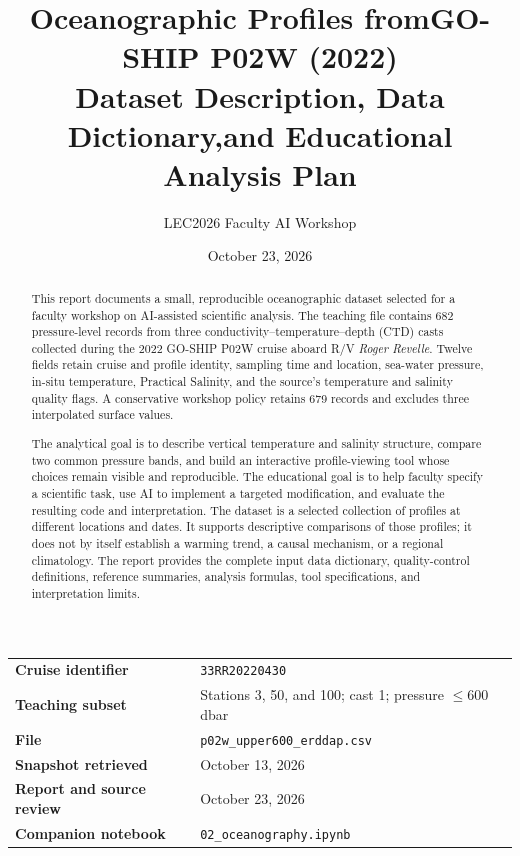 \documentclass[11pt,letterpaper]{article}
\title{\textbf{Oceanographic Profiles from\newline GO-SHIP P02W (2022)}\\[6pt]
  \large Dataset Description, Data Dictionary,\newline and Educational Analysis Plan}
\author{LEC2026 Faculty AI Workshop}
\date{October 23, 2026}
\newcommand{\field}[1]{\nolinkurl{#1}}
\begin{document}
\maketitle
\thispagestyle{empty}

\begin{abstract}
This report documents a small, reproducible oceanographic dataset selected for a faculty workshop on AI-assisted scientific analysis. The teaching file contains 682 pressure-level records from three conductivity--temperature--depth (CTD) casts collected during the 2022 GO-SHIP P02W cruise aboard R/V \emph{Roger Revelle}. Twelve fields retain cruise and profile identity, sampling time and location, sea-water pressure, in-situ temperature, Practical Salinity, and the source's temperature and salinity quality flags. A conservative workshop policy retains 679 records and excludes three interpolated surface values.

The analytical goal is to describe vertical temperature and salinity structure, compare two common pressure bands, and build an interactive profile-viewing tool whose choices remain visible and reproducible. The educational goal is to help faculty specify a scientific task, use AI to implement a targeted modification, and evaluate the resulting code and interpretation. The dataset is a selected collection of profiles at different locations and dates. It supports descriptive comparisons of those profiles; it does not by itself establish a warming trend, a causal mechanism, or a regional climatology. The report provides the complete input data dictionary, quality-control definitions, reference summaries, analysis formulas, tool specifications, and interpretation limits.
\end{abstract}

\begin{center}
\small
\begin{tabular}{ll}
\toprule
\textbf{Cruise identifier} & \field{33RR20220430} \\
\textbf{Teaching subset} & Stations 3, 50, and 100; cast 1; pressure $\leq 600$ dbar \\
\textbf{File} & \field{p02w_upper600_erddap.csv} \\
\textbf{Snapshot retrieved} & October 13, 2026 \\
\textbf{Report and source review} & October 23, 2026 \\
\textbf{Companion notebook} & \field{02_oceanography.ipynb} \\
\bottomrule
\end{tabular}
\end{center}
\end{document}
